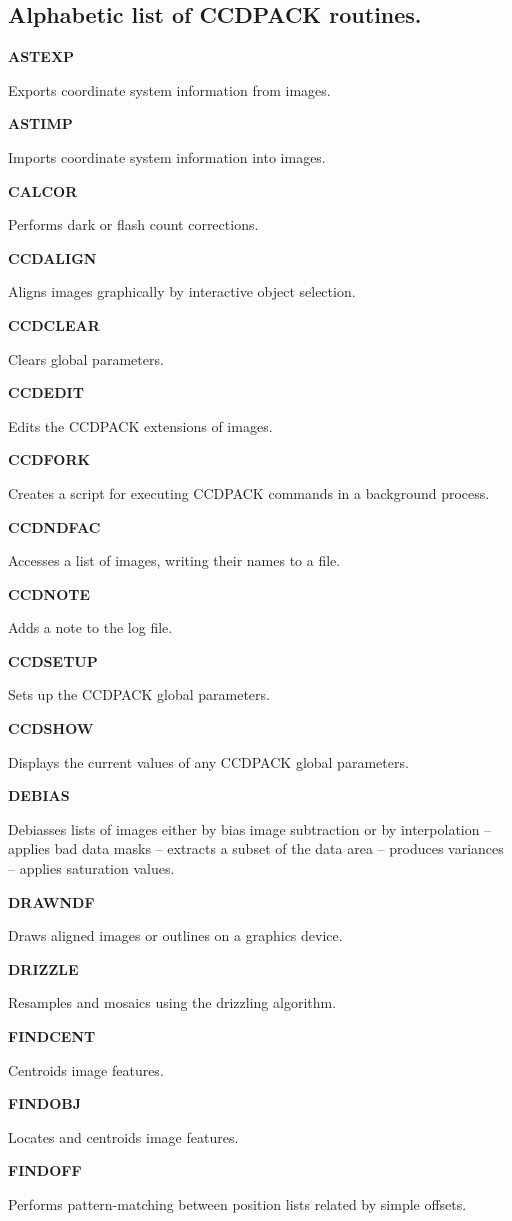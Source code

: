 \documentclass[twoside,11pt]{article}
\newenvironment{latexonly}{}{}
\renewcommand{\_}{\texttt{\symbol{95}}}
\newcommand{\quickdes}[3]{
                         \parbox{1.1in}{\bf #1}
                         \parbox{4.4in}{\raggedright #2 \dotfill}
                         \parbox{0.6in}{\pageref{#3}}
                         \vspace*{0.2in}}
\newcommand{\latexonlysubsection}[1]{\subsection{#1}}
\newcommand{\latexonlysubsection}[1]{#1}
\begin{document}
\newpage
\begin{latexonly}
\latexonlysubsection{Alphabetic list of CCDPACK routines.}
%
%
\quickdes{ASTEXP}{Exports coordinate system information from images.}
         {ASTEXP}

\quickdes{ASTIMP}{Imports coordinate system information into images.}{ASTIMP}

\quickdes{CALCOR}{Performs dark or flash count corrections.}{CALCOR}

\quickdes{CCDALIGN}{Aligns images graphically by interactive object selection.}
         {CCDALIGN}

\quickdes{CCDCLEAR}{Clears global parameters.}
         {CCDCLEAR}


\quickdes{CCDEDIT}{Edits the CCDPACK extensions of images.}
         {CCDEDIT}

\quickdes{CCDFORK}{Creates a script for executing CCDPACK
                   commands in a background process.}{CCDFORK}

\quickdes{CCDNDFAC}{Accesses a list of images, writing their names to a file.}
         {CCDNDFAC}

\quickdes{CCDNOTE}{Adds a note to the log file.}{CCDNOTE}

\quickdes{CCDSETUP}{Sets up the CCDPACK global parameters.}{CCDSETUP}

\quickdes{CCDSHOW}{Displays the current values of any CCDPACK global
                   parameters.}{CCDSHOW}

\quickdes{DEBIAS}{Debiasses lists of images either by bias image
                 subtraction or by interpolation --
                 applies bad data masks --
                 extracts a subset of the data area --
                 produces variances --
                 applies saturation values.}
                 {DEBIAS}

\quickdes{DRAWNDF}{Draws aligned images or outlines on a graphics device.}
                  {DRAWNDF}

\quickdes{DRIZZLE}{Resamples and mosaics using the drizzling algorithm.}
                  {DRIZZLE}

\quickdes{FINDCENT}{Centroids image features.}
                   {FINDCENT}

\quickdes{FINDOBJ}{Locates and centroids image features.}
                  {FINDOBJ}

\quickdes{FINDOFF}{Performs pattern-matching between position lists
                   related by simple offsets.}
                   {FINDOFF}


\end{latexonly}
\end{document}
